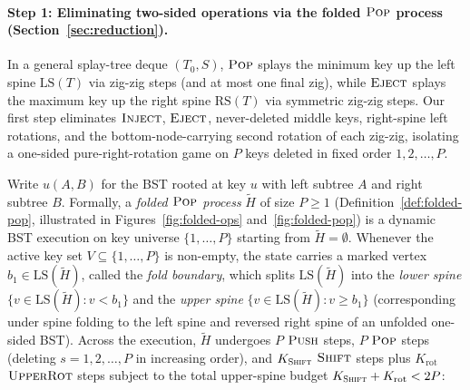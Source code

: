 \documentclass[11pt]{article}
\theoremstyle{definition}
\theoremstyle{remark}
\newcommand{\LS}{\mathrm{LS}}
\newcommand{\RS}{\mathrm{RS}}
\newcommand{\PUSH}{\textnormal{\scshape Push}}
\newcommand{\POP}{\textnormal{\scshape Pop}}
\newcommand{\INJECT}{\textnormal{\scshape Inject}}
\newcommand{\EJECT}{\textnormal{\scshape Eject}}
\newcommand{\SHIFT}{\textnormal{\scshape Shift}}
\newcommand{\UPROT}{\textnormal{\scshape UpperRot}}
\begin{document}
\paragraph{Step 1: Eliminating two-sided operations via the folded $\POP$ process (Section~\ref{sec:reduction}).}
In a general splay-tree deque $(T_0, S)$, $\POP$ splays the minimum key up the left spine $\LS(T)$ via zig-zig steps (and at most one final zig), while $\EJECT$ splays the maximum key up the right spine $\RS(T)$ via symmetric zig-zig steps. Our first step eliminates $\INJECT$, $\EJECT$, never-deleted middle keys, right-spine left rotations, and the bottom-node-carrying second rotation of each zig-zig, isolating a one-sided pure-right-rotation game on $P$ keys deleted in fixed order $1, 2, \dots, P$.

Write $u(A, B)$ for the BST rooted at key $u$ with left subtree $A$ and right subtree $B$. Formally, a \emph{folded $\POP$ process} $\widetilde{H}$ of size $P \ge 1$ (Definition~\ref{def:folded-pop}, illustrated in Figures~\ref{fig:folded-ops} and~\ref{fig:folded-pop}) is a dynamic BST execution on key universe $\{1, \dots, P\}$ starting from $\widetilde{H} = \emptyset$. Whenever the active key set $V \subseteq \{1, \dots, P\}$ is non-empty, the state carries a marked vertex $b_1 \in \LS(\widetilde{H})$, called the \emph{fold boundary}, which splits $\LS(\widetilde{H})$ into the \emph{lower spine} $\{v \in \LS(\widetilde{H}) : v < b_1\}$ and the \emph{upper spine} $\{v \in \LS(\widetilde{H}) : v \ge b_1\}$ (corresponding under spine folding to the left spine and reversed right spine of an unfolded one-sided BST). Across the execution, $\widetilde{H}$ undergoes $P$ $\PUSH$ steps, $P$ $\POP$ steps (deleting $s = 1, 2, \dots, P$ in increasing order), and $K_{\SHIFT}$ $\SHIFT$ steps plus $K_{\mathrm{rot}}$ $\UPROT$ steps subject to the total upper-spine budget $K_{\SHIFT} + K_{\mathrm{rot}} < 2P$:
\end{document}
